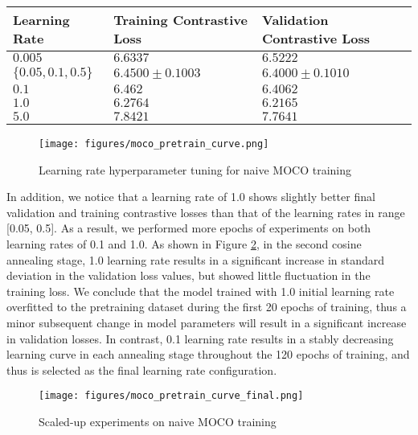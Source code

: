 \documentclass[12pt,twoside]{report}
\begin{document}
\begin{table}[]
    \centering
    \begin{tabular}{lll}
    \toprule
    Learning Rate & Training Contrastive Loss & Validation Contrastive Loss \\
    \midrule
    $0.005$ & $6.6337$ & $6.5222$ \\
    $\{0.05, 0.1, 0.5 \}$ & $6.4500 \pm 0.1003$ & $6.4000 \pm 0.1010 $ \\
    $0.1$ & $6.462$ & $6.4062$ \\
    $1.0$ & $6.2764$ & $6.2165$ \\
    $5.0$ & $7.8421$ & $7.7641$ \\
    \bottomrule
    \end{tabular}
    \captionsetup{type=table}
    \label{tab:naive_moco_tuning}
\end{table}

\begin{figure}
    \centering
    \texttt{[image: figures/moco\_pretrain\_curve.png]}
    \caption{Learning rate hyperparameter tuning for naive MOCO training}
    \label{fig:naiveMOCO_pretrain_curve}
\end{figure}

In addition, we notice that a learning rate of 1.0 shows slightly better final validation and training contrastive losses than that of the learning rates in range [0.05, 0.5]. As a result, we performed more epochs of experiments on both learning rates of 0.1 and 1.0. As shown in Figure \ref{fig:naiveMOCO_pretrain_curve_final}, in the second cosine annealing stage, 1.0 learning rate results in a significant increase in standard deviation in the validation loss values, but showed little fluctuation in the training loss. We conclude that the model trained with 1.0 initial learning rate overfitted to the pretraining dataset during the first 20 epochs of training, thus a minor subsequent change in model parameters will result in a significant increase in validation losses. In contrast, 0.1 learning rate results in a stably decreasing learning curve in each annealing stage throughout the 120 epochs of training, and thus is selected as the final learning rate configuration. \\

\begin{figure}
    \centering
    \texttt{[image: figures/moco\_pretrain\_curve\_final.png]}
    \caption{Scaled-up experiments on naive MOCO training}
    \label{fig:naiveMOCO_pretrain_curve_final}
\end{figure}
\end{document}
